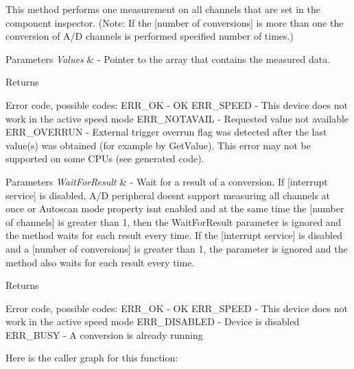 This method performs one measurement on all channels that are set in the component inspector. (Note\+: If the \mbox{[}number of conversions\mbox{]} is more than one the conversion of A/D channels is performed specified number of times.)


\begin{DoxyParams}{Parameters}
{\em Values} & -\/ Pointer to the array that contains the measured data. \\
\hline
\end{DoxyParams}
\begin{DoxyReturn}{Returns}

\begin{DoxyItemize}
\item Error code, possible codes\+: E\+R\+R\+\_\+\+OK -\/ OK E\+R\+R\+\_\+\+S\+P\+E\+ED -\/ This device does not work in the active speed mode E\+R\+R\+\_\+\+N\+O\+T\+A\+V\+A\+IL -\/ Requested value not available E\+R\+R\+\_\+\+O\+V\+E\+R\+R\+UN -\/ External trigger overrun flag was detected after the last value(s) was obtained (for example by Get\+Value). This error may not be supported on some C\+P\+Us (see generated code).
\end{DoxyItemize}
\end{DoxyReturn}

\begin{DoxyParams}{Parameters}
{\em Wait\+For\+Result} & -\/ Wait for a result of a conversion. If \mbox{[}interrupt service\mbox{]} is disabled, A/D peripheral doesn\textquotesingle{}t support measuring all channels at once or Autoscan mode property isn\textquotesingle{}t enabled and at the same time the \mbox{[}number of channels\mbox{]} is greater than 1, then the Wait\+For\+Result parameter is ignored and the method waits for each result every time. If the \mbox{[}interrupt service\mbox{]} is disabled and a \mbox{[}number of conversions\mbox{]} is greater than 1, the parameter is ignored and the method also waits for each result every time. \\
\hline
\end{DoxyParams}
\begin{DoxyReturn}{Returns}

\begin{DoxyItemize}
\item Error code, possible codes\+: E\+R\+R\+\_\+\+OK -\/ OK E\+R\+R\+\_\+\+S\+P\+E\+ED -\/ This device does not work in the active speed mode E\+R\+R\+\_\+\+D\+I\+S\+A\+B\+L\+ED -\/ Device is disabled E\+R\+R\+\_\+\+B\+U\+SY -\/ A conversion is already running 
\end{DoxyItemize}
\end{DoxyReturn}
Here is the caller graph for this function\+:
\mbox{\label{group___a_d1__module_ga4e331d6fe384835bec07cb2878de30c7}} 
